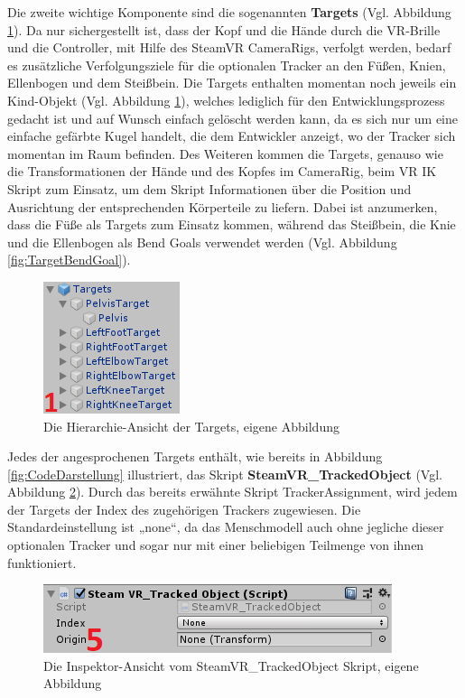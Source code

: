 \newline
Die zweite wichtige Komponente sind die sogenannten \textbf{Targets} (Vgl. Abbildung \ref{fig:Targets}). Da nur sichergestellt ist, dass der Kopf und die Hände durch die VR-Brille und die Controller, mit Hilfe des SteamVR CameraRigs, verfolgt werden, bedarf es zusätzliche Verfolgungsziele für die optionalen Tracker an den Füßen, Knien, Ellenbogen und dem Steißbein. Die Targets enthalten momentan noch jeweils ein Kind-Objekt (Vgl. Abbildung \ref{fig:Targets}), welches lediglich für den Entwicklungsprozess gedacht ist und auf Wunsch einfach gelöscht werden kann, da es sich nur um eine einfache gefärbte Kugel handelt, die dem Entwickler anzeigt, wo der Tracker sich momentan im Raum befinden. Des Weiteren kommen die Targets, genauso wie die Transformationen der Hände und des Kopfes im CameraRig, beim VR IK Skript zum Einsatz, um dem Skript Informationen über die Position und Ausrichtung der entsprechenden Körperteile zu liefern. Dabei ist anzumerken, dass die Füße als Targets zum Einsatz kommen, während das Steißbein, die Knie und die Ellenbogen als Bend Goals verwendet werden (Vgl. Abbildung \ref{fig:TargetBendGoal}).
\begin{figure}[h]
	\centering
	\includegraphics[width=0.25\linewidth]{Bilder/A38_Targets2}
	\caption{Die Hierarchie-Ansicht der Targets, eigene Abbildung}
	\label{fig:Targets}
\end{figure}
\newline
Jedes der angesprochenen Targets enthält, wie bereits in Abbildung \ref{fig:CodeDarstellung} illustriert, das Skript \textbf{SteamVR\_TrackedObject} (Vgl. Abbildung \ref{fig:TrackedObject}). Durch das bereits erwähnte Skript TrackerAssignment, wird jedem der Targets der Index des zugehörigen Trackers zugewiesen. Die Standardeinstellung ist „none“, da das Menschmodell auch ohne jegliche dieser optionalen Tracker und sogar nur mit einer beliebigen Teilmenge von ihnen funktioniert.
\begin{figure}[h]
	\centering
	\includegraphics[width=0.45\linewidth]{Bilder/A39_SteamVRTrackedObject2}
	\caption{Die Inspektor-Ansicht vom SteamVR\_TrackedObject Skript, eigene Abbildung}
	\label{fig:TrackedObject}
\end{figure}

